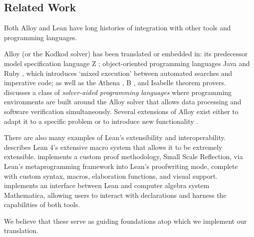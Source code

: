\subsection{Related Work}\label{sec:bg-related}

Both Alloy and Lean have long histories of integration with other tools and programming languages. 

Alloy (or the Kodkod solver) has been translated or embedded in: its predecessor model specification language Z \cite{malik2010translating}; object-oriented programming languages Java \cite{milicevic2010executable} and Ruby \cite{milicevic2014alpha}, which introduces `mixed execution' between automated searches and imperative code; as well as the Athena \cite{arkoudas2000denotational,musser2003proving}, B \cite{mikhailov2002approach,krings2018translation}, and Isabelle \cite{blanchette2010nitpick} theorem provers. \cite{st2023comparison} discusses a class of \emph{solver-aided programming languages} where programming environments are built around the Alloy solver that allows data processing and software verification simultaneously. Several extensions of Alloy exist either to adapt it to a specific problem \cite{nelson2014tierless,nelson2015static} or to introduce new functionality \cite{nelson2012toward,milicevic2019alloy,yang2020alloymc}. 

There are also many examples of Lean's extensibility and interoperability. \cite{ullrich2022beyond} describes Lean 4's extensive macro system that allows it to be extremely extensible. \cite{gladshtein2024small} implements a custom proof methodology, Small Scale Reflection, via Lean's metaprogramming framework into Lean's proofwriting mode, complete with custom syntax, macros, elaboration functions, and visual support. \cite{lewis2022bi} implements an interface between Lean and computer algebra system Mathematica, allowing users to interact with declarations and harness the capabilities of both tools. 

We believe that these serve as guiding foundations atop which we implement our translation. 